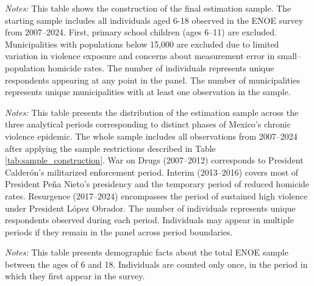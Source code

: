 \documentclass[12pt,letter,english,intoc,bibliography=totoc,index=totoc,BCOR10mm,captions=tableheading,nottitlepage,fleqn]{article}
\theoremstyle{break}
\begin{document}
\begin{table}[H]
\centering
\caption{Sample Construction}
\label{tab:sample_construction}
\centering
\footnotesize

\begin{minipage}{0.95\linewidth}
    \scriptsize \singlespacing
    \textit{Notes:} This table shows the construction of the final estimation sample. The starting sample includes all individuals aged 6-18 observed in the ENOE survey from 2007--2024. First, primary school children (ages 6--11) are excluded. Municipalities with populations below 15,000 are excluded due to limited variation in violence exposure and concerns about measurement error in small--population homicide rates. The number of individuals represents unique respondents appearing at any point in the panel. The number of municipalities represents unique municipalities with at least one observation in the sample.
    \end{minipage}
\end{table}

\begin{table}[H]
\centering
\caption{Time Period Sample}
\label{tab:sample_time_period}
\centering
\footnotesize

\begin{minipage}{0.95\linewidth}
    \scriptsize \singlespacing
    \textit{Notes:} This table presents the distribution of the estimation sample across the three analytical periods corresponding to distinct phases of Mexico's chronic violence epidemic. The whole sample includes all observations from 2007--2024 after applying the sample restrictions described in Table \ref{tab:sample_construction}. War on Drugs (2007--2012) corresponds to President Calder\'{o}n's militarized enforcement period. Interim (2013--2016) covers most of President Pe\~{n}a Nieto's presidency and the temporary period of reduced homicide rates. Resurgence (2017--2024) encompasses the period of sustained high violence under President L\'{o}pez Obrador. The number of individuals represents unique respondents observed during each period. Individuals may appear in multiple periods if they remain in the panel across period boundaries.
    \end{minipage}
\end{table}

\begin{table}[H]
\centering
\caption{Demographics By Period}
\label{tab:demographics by period}
\centering
\footnotesize

\begin{minipage}{0.95\linewidth}
    \scriptsize \singlespacing
    \textit{Notes:} This table presents demographic facts about the total ENOE sample between the ages of 6 and 18. Individuals are counted only once, in the period in which they first appear in the survey. 
    \end{minipage}
\end{table}
\end{document}
